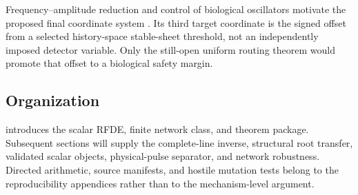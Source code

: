 Frequency--amplitude reduction and control of biological oscillators motivate
the proposed final coordinate system
\citep{wilson2016isostable,kotani2020nonlinear,qin2021coordinator,
zhong2023modulating}.  Its third target coordinate is the signed offset from
a selected history-space stable-sheet threshold, not an independently
imposed detector variable.  Only the still-open uniform routing theorem would
promote that offset to a biological safety margin.

\subsection{Organization}

 introduces the scalar RFDE, finite network class,
and theorem package.  Subsequent sections will supply the complete-line
inverse, structural root transfer, validated scalar objects, physical-pulse
separator, and network robustness.  Directed arithmetic, source manifests,
and hostile mutation tests belong to the reproducibility appendices rather
than to the mechanism-level argument.
